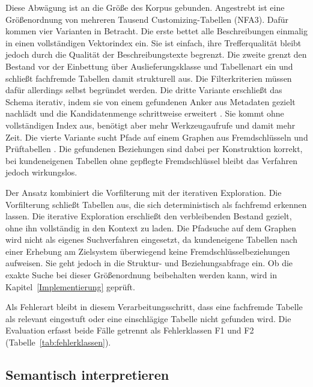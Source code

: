 Diese Abwägung ist an die Größe des Korpus gebunden. Angestrebt ist eine Größenordnung von mehreren Tausend Customizing-Tabellen (NFA3). Dafür kommen vier Varianten in Betracht. Die erste bettet alle Beschreibungen einmalig in einen vollständigen Vektorindex ein. Sie ist einfach, ihre Trefferqualität bleibt jedoch durch die Qualität der Beschreibungstexte begrenzt. Die zweite grenzt den Bestand vor der Einbettung über Auslieferungsklasse und Tabellenart ein und schließt fachfremde Tabellen damit strukturell aus. Die Filterkriterien müssen dafür allerdings selbst begründet werden. Die dritte Variante erschließt das Schema iterativ, indem sie von einem gefundenen Anker aus Metadaten gezielt nachlädt und die Kandidatenmenge schrittweise erweitert \cite{wang_autolink_2026}. Sie kommt ohne vollständigen Index aus, benötigt aber mehr Werkzeugaufrufe und damit mehr Zeit. Die vierte Variante sucht Pfade auf einem Graphen aus Fremdschlüsseln und Prüftabellen \cite{safdarian_schemagraphsql_2026}. Die gefundenen Beziehungen sind dabei per Konstruktion korrekt, bei kundeneigenen Tabellen ohne gepflegte Fremdschlüssel bleibt das Verfahren jedoch wirkungslos.

Der Ansatz kombiniert die Vorfilterung mit der iterativen Exploration. Die Vorfilterung schließt Tabellen aus, die sich deterministisch als fachfremd erkennen lassen. Die iterative Exploration erschließt den verbleibenden Bestand gezielt, ohne ihn vollständig in den Kontext zu laden. Die Pfadsuche auf dem Graphen wird nicht als eigenes Suchverfahren eingesetzt, da kundeneigene Tabellen nach einer Erhebung am Zielsystem überwiegend keine Fremdschlüsselbeziehungen aufweisen.%
Sie geht jedoch in die Struktur- und Beziehungsabfrage ein. Ob die exakte Suche bei dieser Größenordnung beibehalten werden kann, wird in Kapitel~\ref{Implementierung} geprüft.

Als Fehlerart bleibt in diesem Verarbeitungsschritt, dass eine fachfremde Tabelle als relevant eingestuft oder eine einschlägige Tabelle nicht gefunden wird. Die Evaluation erfasst beide Fälle getrennt als Fehlerklassen F1 und F2 (Tabelle~\ref{tab:fehlerklassen}).

\subsection{Semantisch interpretieren}
\label{subsec:ta-interpretieren}

